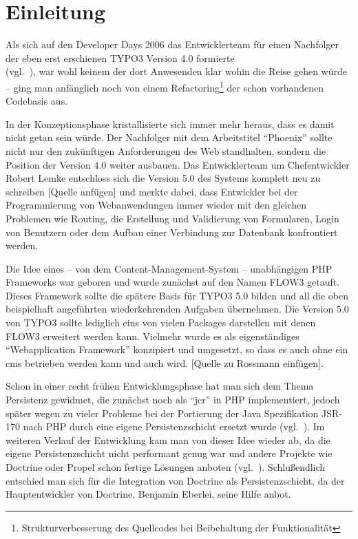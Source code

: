 \chapter{Einleitung}
\label{ch:intro}
Als sich auf den Developer Days 2006 das Entwicklerteam für einen Nachfolger der eben erst erschienen TYPO3 Version 4.0 formierte\\ (vgl.~\cite{web:berlinManifesto2008}), war wohl keinem der dort Anwesenden klar wohin die Reise gehen würde – ging man anfänglich noch von einem Refactoring\footnote{Strukturverbesserung des Quellcodes bei Beibehaltung der Funktionalität} der schon vorhandenen Codebasis aus.

In der Konzeptionsphase kristallisierte sich immer mehr heraus, dass es damit nicht getan sein würde. Der Nachfolger mit dem Arbeitstitel ``Phoenix'' sollte nicht nur den zukünftigen Anforderungen des Web standhalten, sondern die Position der Version 4.0 weiter ausbauen. Das Entwicklerteam um Chefentwickler Robert Lemke entschloss sich die Version 5.0 des Systems komplett neu zu schreiben [Quelle anfügen] und merkte dabei, dass Entwickler bei der Programmierung von Webanwendungen immer wieder mit den gleichen Problemen wie Routing, die Erstellung und Validierung von Formularen, Login von Benutzern oder dem Aufbau einer Verbindung zur Datenbank konfrontiert werden.

Die Idee eines – von dem Content-Management-System – unabhängigen PHP Frameworks war geboren und wurde zunächst auf den Namen FLOW3 getauft. Dieses Framework sollte die spätere Basis für TYPO3 5.0 bilden und all die oben beispielhaft angeführten wiederkehrenden Aufgaben übernehmen. Die Version 5.0 von TYPO3 sollte lediglich eins von vielen Packages darstellen mit denen FLOW3 erweitert werden kann. Vielmehr wurde es als eigenständiges ``Webapplication Framework'' konzipiert und umgesetzt, so dass es auch ohne ein \gls{cms} betrieben werden kann und auch wird. [Quelle zu Rossmann einfügen].

Schon in einer recht frühen Entwicklungsphase hat man sich dem Thema Persistenz gewidmet, die zunächst noch als ``\gls{jcr}'' in PHP implementiert, jedoch später wegen zu vieler Probleme bei der Portierung der Java Spezifikation JSR-170 nach PHP durch eine eigene Persistenzschicht ersetzt wurde (vgl.~\cite{web:dambekalnsFroscamp2010}). Im weiteren Verlauf der Entwicklung kam man von dieser Idee wieder ab, da die eigene Persistenzschicht nicht performant genug war und andere Projekte wie Doctrine oder Propel schon fertige Lösungen anboten (vgl.~\cite{twitter:DoctrineFlow2014}). Schlußendlich entschied man sich für die Integration von Doctrine als Persistenzschicht, da der Hauptentwickler von Doctrine, Benjamin Eberlei, seine Hilfe anbot.

